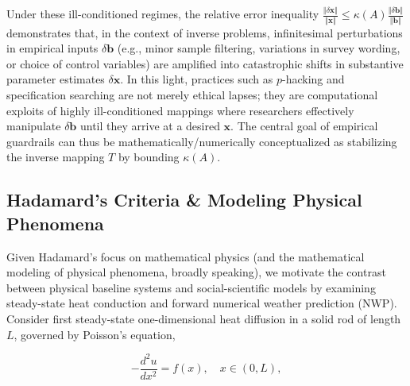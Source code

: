 \documentclass{article}
\theoremstyle{definition}
\begin{document}
\noindent
Under these ill-conditioned regimes, the relative error inequality $\frac{\Vert{}\delta \mathbf{x}\Vert{}}{\Vert{}\mathbf{x}\Vert{}} \le \kappa(A) \frac{\Vert{}\delta \mathbf{b}\Vert{}}{\Vert{}\mathbf{b}\Vert{}}$ demonstrates that, in the context of inverse problems, infinitesimal perturbations in empirical inputs $\delta \mathbf{b}$ (e.g., minor sample filtering, variations in survey wording, or choice of control variables) are amplified into catastrophic shifts in substantive parameter estimates $\delta \mathbf{x}$. In this light, practices such as $p$-hacking and specification searching are not merely ethical lapses; they are computational exploits of highly ill-conditioned mappings where researchers effectively manipulate $\delta \mathbf{b}$ until they arrive at a desired $\mathbf{x}$. The central goal of empirical guardrails can thus be mathematically/numerically conceptualized as stabilizing the inverse mapping $T$ by bounding $\kappa(A)$.

\subsection{Hadamard's Criteria \& Modeling Physical Phenomena}

Given Hadamard's focus on mathematical physics (and the mathematical modeling of physical phenomena, broadly speaking), we motivate the contrast between physical baseline systems and social-scientific models by examining steady-state heat conduction and forward numerical weather prediction (NWP). Consider first steady-state one-dimensional heat diffusion in a solid rod of length $L$, governed by Poisson's equation, 

\begin{equation}
    -\frac{d^2 u}{dx^2} = f(x), \quad x \in (0, L),
\end{equation}
\end{document}
